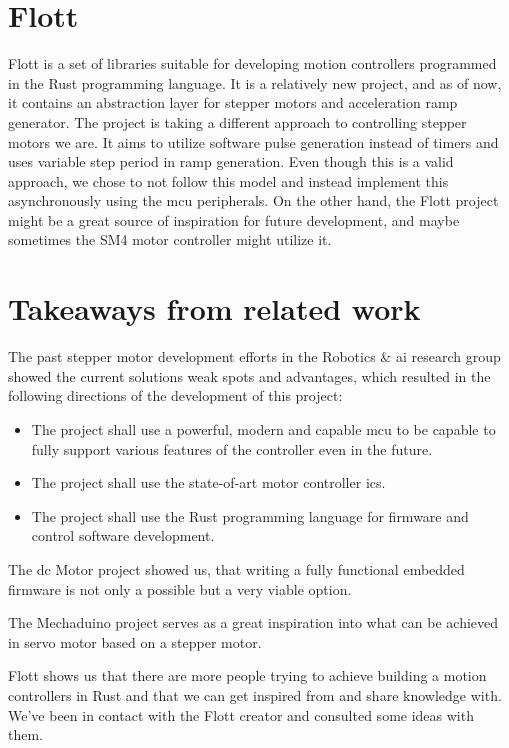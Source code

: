 \section{Flott}
\label{sec:flott}
Flott is a set of libraries suitable for developing motion controllers programmed in the Rust programming language\cite{braun_flott_nodate}.
It is a relatively new project, and as of now, it contains an abstraction layer for stepper motors and acceleration ramp generator.
The project is taking a different approach to controlling stepper motors we are.
It aims to utilize software pulse generation instead of timers and uses variable step period in ramp generation.
Even though this is a valid approach, we chose to not follow this model and instead implement this asynchronously using the \acs{mcu} peripherals.
On the other hand, the Flott project might be a great source of inspiration for future development, and maybe sometimes the SM4 motor controller might utilize it.

\section{Takeaways from related work}
\label{sec:related-work-takeaways}
The past stepper motor development efforts in the Robotics \& \acs{ai} research group showed the current solutions weak spots and advantages, which resulted in the following directions of the development of this project:
\begin{itemize}
    \item The project shall use a powerful, modern and capable \acs{mcu} to be capable to fully support various features of the controller even in the future.
    \item The project shall use the state-of-art motor controller \acs{ic}s.
    \item The project shall use the Rust programming language for firmware and control software development.
\end{itemize}

The \acs{dc} Motor project showed us, that writing a fully functional embedded firmware is not only a possible but a very viable option.

The Mechaduino project serves as a great inspiration into what can be achieved in servo motor based on a stepper motor.

Flott shows us that there are more people trying to achieve building a motion controllers in Rust and that we can get inspired from and share knowledge with.
We've been in contact with the Flott creator and consulted some ideas with them.
